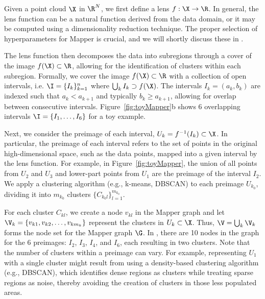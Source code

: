 Given a point cloud $\X$ in $\R^N$, we first define a lens $f:\X\to\R$. In general, the lens function can be a natural function derived from the data domain, or it may be computed using a dimensionality reduction technique. The proper selection of hyperparameters for Mapper is crucial, and we will shortly discuss these in .

The lens function then decomposes the data into subregions through a cover of the image $f(\X)\subset \R$, allowing for the identification of clusters within each subregion.  %
Formally, we cover the image $f(\X)\subset \R$ with a collection of open intervals, i.e. $\I = \{I_k\}_{k=1}^{n}$ where $\bigcup_k I_k\supset f(\X)$. The intervals $I_k=(a_k,b_k)$ are indexed such that $a_k < a_{k+1}$ and typically $b_k \geq a_{k+1}$, allowing for overlap between consecutive intervals.  Figure~\ref{fig:toyMapper}b shows 6 overlapping intervals $\I=\{I_1,\dots, I_6\}$ for a toy example. 

Next, we consider the preimage of each interval, $U_k=f^{-1}(I_k)\subset \X$. In particular, the preimage of each interval refers to the set of points in the original high-dimensional space, such as the data points, mapped into a given interval by the lens function. For example,  in Figure~\ref{fig:toyMapper}, the union of all points from $U_2$ and $U_3$ and lower-part points from $U_1$ are the preimage of the interval $I_2$. We apply a clustering algorithm (e.g., k-means, DBSCAN) to each preimage $U_{k_0}$, dividing it into $m_{k_0}$ clusters $\{C_{k_0l}\}_{l=1}^{m_{k_0}}$. 

For each cluster $C_{kl}$, we create a node $v_{kl}$ in the Mapper graph and let $\V_k=\{v_{k1}, v_{k2}, \dots, v_{km_k}\}$ represent the clusters in $U_k\subset \X$. Thus, $\V=\bigcup_k \V_k$ forms the node set for the Mapper graph $\G$.  In , there are 10 nodes in the graph for the 6 preimages: $I_2$, $I_3$, $I_4$, and $I_6$, each resulting in two clusters. Note that the number of clusters within a preimage can vary. For example, representing $U_1$ with a single cluster might result from using a density-based clustering algorithm (e.g., DBSCAN), which identifies dense regions as clusters while treating sparse regions as noise, thereby avoiding the creation of clusters in those less populated areas.



